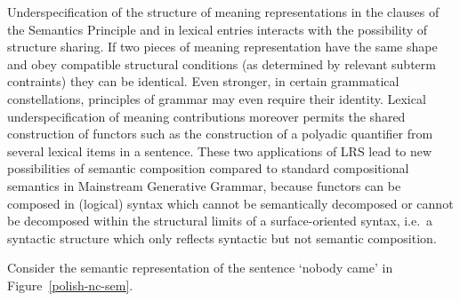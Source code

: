 \documentclass[output=paper]{langsci/langscibook}
\begin{document}
Underspecification of the structure of meaning representations in the
clauses of the Semantics Principle and in lexical entries interacts
with the possibility of structure sharing. If two pieces of meaning
representation have the same shape and obey compatible structural
conditions (as determined by relevant subterm contraints) they can be
identical. Even stronger, in certain grammatical constellations,
principles of grammar may even require their
identity. Lexical underspecification of meaning contributions moreover
permits the shared construction of functors such as the construction
of a polyadic quantifier from several lexical items in a
sentence. These two applications of LRS lead to new possibilities
of semantic composition compared to standard compositional semantics
in Mainstream Generative Grammar, because functors can be composed in (logical) syntax
which cannot be semantically decomposed or cannot be decomposed within
the structural limits of a surface-oriented syntax, i.e.\ a syntactic
structure which only reflects syntactic but not semantic composition.





Consider the semantic representation of the  sentence  `nobody came' in Figure~\ref{polish-nc-sem}. 
\end{document}
